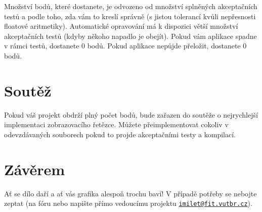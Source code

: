 Množství bodů, které dostanete, je odvozeno od množství splněných akceptačních testů a podle toho, zda vám to kreslí správně (s jistou tolerancí kvůli nepřesnosti floatové aritmetiky). Automatické opravování má k dispozici větší množství akceptačních testů (kdyby někoho napadlo je obejít). Pokud vám aplikace spadne v rámci testů, dostanete 0 bodů. Pokud aplikace nepůjde přeložit, dostanete 0 bodů.\hypertarget{index_soutez}{}\section{Soutěž}\label{index_soutez}
Pokud váš projekt obdrží plný počet bodů, bude zařazen do soutěže o nejrychlejší implementaci zobrazovacího řetězce. Můžete přeimplementovat cokoliv v odevzdávaných souborech pokud to projde akceptačními testy a kompilací.\hypertarget{index_zaver}{}\section{Závěrem}\label{index_zaver}
Ať se dílo daří a ať vás grafika alespoň trochu baví! V případě potřeby se nebojte zeptat (na fóru nebo napište přímo vedoucímu projektu \href{mailto:imilet@fit.vutbr.cz}{\tt imilet@fit.\+vutbr.\+cz}). 